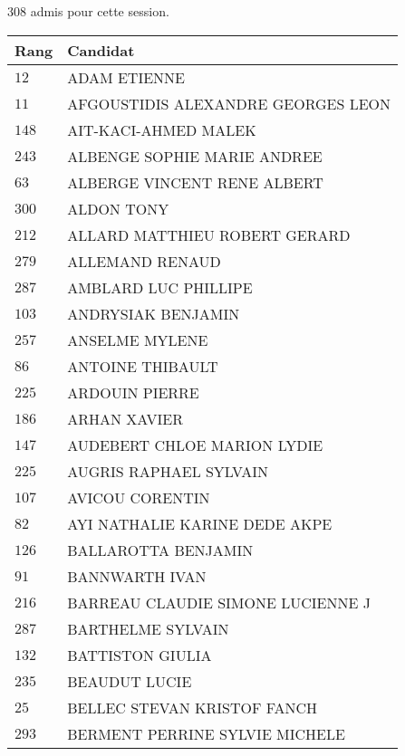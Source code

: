 




  $308$ admis pour cette session.

  \begin{xltabular}{\linewidth}{|l|X|}
    \hline
    \textbf{Rang} & \textbf{Candidat} \\
    \hline
    $12$ & ADAM ETIENNE \\
    \hline
    $11$ & AFGOUSTIDIS ALEXANDRE GEORGES LEON \\
    \hline
    $148$ & AIT-KACI-AHMED MALEK \\
    \hline
    $243$ & ALBENGE SOPHIE MARIE ANDREE \\
    \hline
    $63$ & ALBERGE VINCENT RENE ALBERT \\
    \hline
    $300$ & ALDON TONY \\
    \hline
    $212$ & ALLARD MATTHIEU ROBERT GERARD \\
    \hline
    $279$ & ALLEMAND RENAUD \\
    \hline
    $287$ & AMBLARD LUC PHILLIPE \\
    \hline
    $103$ & ANDRYSIAK BENJAMIN \\
    \hline
    $257$ & ANSELME MYLENE \\
    \hline
    $86$ & ANTOINE THIBAULT \\
    \hline
    $225$ & ARDOUIN PIERRE \\
    \hline
    $186$ & ARHAN XAVIER \\
    \hline
    $147$ & AUDEBERT CHLOE MARION LYDIE \\
    \hline
    $225$ & AUGRIS RAPHAEL SYLVAIN \\
    \hline
    $107$ & AVICOU CORENTIN \\
    \hline
    $82$ & AYI NATHALIE KARINE DEDE AKPE \\
    \hline
    $126$ & BALLAROTTA BENJAMIN \\
    \hline
    $91$ & BANNWARTH IVAN \\
    \hline
    $216$ & BARREAU CLAUDIE SIMONE LUCIENNE J \\
    \hline
    $287$ & BARTHELME SYLVAIN \\
    \hline
    $132$ & BATTISTON GIULIA \\
    \hline
    $235$ & BEAUDUT LUCIE \\
    \hline
    $25$ & BELLEC STEVAN KRISTOF FANCH \\
    \hline
    $293$ & BERMENT PERRINE SYLVIE MICHELE \\

\end{xltabular}
